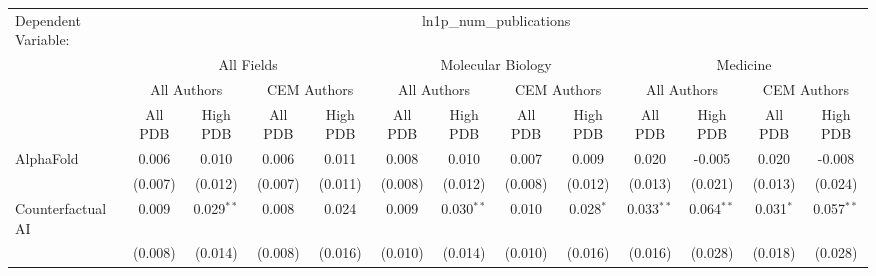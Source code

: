 \begingroup
\centering
\begin{tabular}{lcccccccccccc}
   \tabularnewline \midrule \midrule
   Dependent Variable: & \multicolumn{12}{c}{ln1p\_num\_publications}\\
 & \multicolumn{4}{c}{All Fields} & \multicolumn{4}{c}{Molecular Biology} & \multicolumn{4}{c}{Medicine} \\
\cmidrule(lr){2-5} \cmidrule(lr){6-9} \cmidrule(lr){10-13}
 & \multicolumn{2}{c}{All Authors} & \multicolumn{2}{c}{CEM Authors} & \multicolumn{2}{c}{All Authors} & \multicolumn{2}{c}{CEM Authors} & \multicolumn{2}{c}{All Authors} & \multicolumn{2}{c}{CEM Authors} \\
\cmidrule(lr){2-3} \cmidrule(lr){4-5} \cmidrule(lr){6-7} \cmidrule(lr){8-9} \cmidrule(lr){10-11} \cmidrule(lr){12-13}
 & \multicolumn{1}{c}{All PDB} & \multicolumn{1}{c}{High PDB} & \multicolumn{1}{c}{All PDB} & \multicolumn{1}{c}{High PDB} & \multicolumn{1}{c}{All PDB} & \multicolumn{1}{c}{High PDB} & \multicolumn{1}{c}{All PDB} & \multicolumn{1}{c}{High PDB} & \multicolumn{1}{c}{All PDB} & \multicolumn{1}{c}{High PDB} & \multicolumn{1}{c}{All PDB} & \multicolumn{1}{c}{High PDB} \\
\cmidrule(lr){2-2} \cmidrule(lr){3-3} \cmidrule(lr){4-4} \cmidrule(lr){5-5} \cmidrule(lr){6-6} \cmidrule(lr){7-7} \cmidrule(lr){8-8} \cmidrule(lr){9-9} \cmidrule(lr){10-10} \cmidrule(lr){11-11} \cmidrule(lr){12-12} \cmidrule(lr){13-13}
   AlphaFold                                                  & 0.006         & 0.010         & 0.006         & 0.011         & 0.008        & 0.010         & 0.007        & 0.009         & 0.020        & -0.005       & 0.020         & -0.008\\   
                                                              & (0.007)       & (0.012)       & (0.007)       & (0.011)       & (0.008)      & (0.012)       & (0.008)      & (0.012)       & (0.013)      & (0.021)      & (0.013)       & (0.024)\\   
   Counterfactual AI                                          & 0.009         & 0.029$^{**}$  & 0.008         & 0.024         & 0.009        & 0.030$^{**}$  & 0.010        & 0.028$^{*}$   & 0.033$^{**}$ & 0.064$^{**}$ & 0.031$^{*}$   & 0.057$^{**}$\\   
                                                              & (0.008)       & (0.014)       & (0.008)       & (0.016)       & (0.010)      & (0.014)       & (0.010)      & (0.016)       & (0.016)      & (0.028)      & (0.018)       & (0.028)\\   

\end{tabular}
